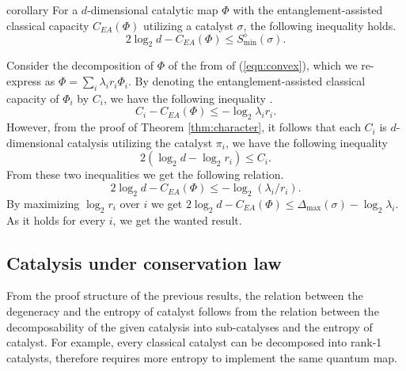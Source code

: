 \documentclass[aps, reprint, amsmath,amssymb, prx, superscriptaddress]{revtex4-2}
\begin{document}
\begin{theoremEnd}{corollary} \label{coro:tradeoff}
For a $d$-dimensional catalytic map $\Phi$ with the entanglement-assisted classical capacity $C_{EA}(\Phi)$ utilizing a catalyst $\sigma$, the following inequality holds.
    \begin{equation} \label{eqn:tradeoff}
        2\log_2  d - C_{EA}(\Phi) \leq S_{\min{}}^\diamond(\sigma).
    \end{equation}
\end{theoremEnd}
\begin{proofEnd}
    Consider the decomposition of $\Phi$ of the from of (\ref{eqn:convex}), which we re-express as $\Phi=\sum_i \lambda_i r_i \Phi_i$. By denoting the entanglement-assisted classical capacity of $\Phi_i$ by $C_i$, we have the following inequality \cite{lie2020randomness}.
    \begin{equation}
        C_i-C_{EA}(\Phi) \leq - \log_2 \lambda_i r_i.
    \end{equation}
    However, from the proof of Theorem \ref{thm:character}, it follows that each $C_i$ is $d$-dimensional catalysis utilizing the catalyst $\pi_i$, we have the following inequality \cite{lie2020uniform}
    \begin{equation}
        2(\log_2  d - \log_2  r_i) \leq C_i. 
    \end{equation}
    From these two inequalities we get the following relation.
    \begin{equation}
        2\log_2  d - C_{EA}(\Phi) \leq - \log_2  (\lambda_i/r_i).
    \end{equation}
    By maximizing $\log_2  r_i$ over $i$ we get $2\log_2  d - C_{EA}(\Phi) \leq \Delta_{\max{}}(\sigma) - \log_2  \lambda_i$. As it holds for every $i$, we get the wanted result.
\end{proofEnd}




\subsection{Catalysis under conservation law} \label{subsec:catund}
   
    From the proof structure of the previous results, the relation between the degeneracy and the entropy of catalyst follows from the relation between the decomposability of the given catalysis into sub-catalyses and the entropy of catalyst. For example, every classical catalyst can be decomposed into rank-1 catalysts, therefore requires more entropy to implement the same quantum map.
 
\end{document}
